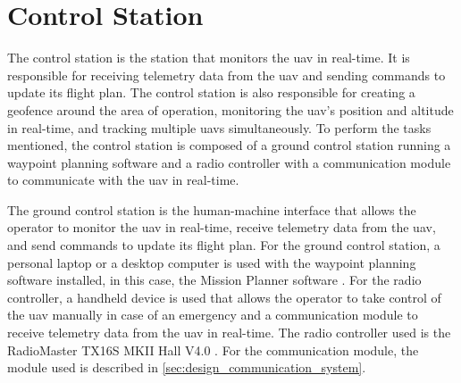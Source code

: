 \section{Control Station}\label{sec:design_control_station}

The control station is the station that monitors the \gls{uav} in real-time. It is responsible for receiving telemetry data from the \gls{uav} and sending commands to update its flight plan. The control station is also responsible for creating a geofence around the area of operation, monitoring the \gls{uav}'s position and altitude in real-time, and tracking multiple \glspl{uav} simultaneously. To perform the tasks mentioned, the control station is composed of a ground control station running a waypoint planning software and a radio controller with a communication module to communicate with the \gls{uav} in real-time.

The ground control station is the human-machine interface that allows the operator to monitor the \gls{uav} in real-time, receive telemetry data from the \gls{uav}, and send commands to update its flight plan. For the ground control station, a personal laptop or a desktop computer is used with the waypoint planning software installed, in this case, the Mission Planner software \autocite{ardupilotMissionPlanner}. For the radio controller, a handheld device is used that allows the operator to take control of the \gls{uav} manually in case of an emergency and a communication module to receive telemetry data from the \gls{uav} in real-time. The radio controller used is the RadioMaster TX16S MKII Hall V4.0 \autocite{rcinnovationsRadioMasterTX16S}. For the communication module, the module used is described in \cref{sec:design_communication_system}.

